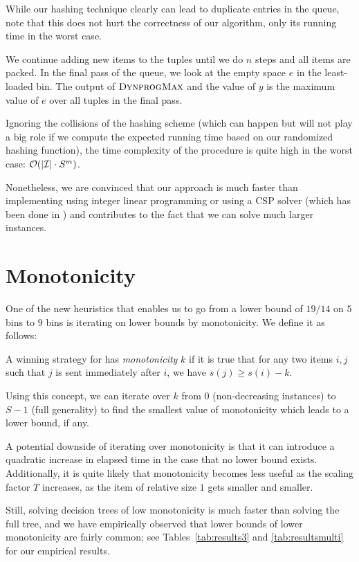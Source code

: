 While our hashing technique clearly can lead to duplicate entries in
the queue, note that this does not hurt the correctness of our
algorithm, only its running time in the worst case.

We continue adding new items to the tuples until we do $n$ steps and
all items are packed. In the final pass of the queue, we look at the
empty space $e$ in the least-loaded bin. The output of $\textsc{DynprogMax}$
and the value of $y$ is the maximum value of $e$ over all tuples in
the final pass.

Ignoring the collisions of the hashing scheme (which can happen but
will not play a big role if we compute the expected running time based
on our randomized hashing function), the time complexity of the
procedure \MaxFeas is quite high in the worst case: ${\mathcal{O}}(|{\mathcal I}|\cdot
S^m)$.

Nonetheless, we are convinced that our approach is much faster than
implementing \MaxFeas using integer linear programming or using a CSP
solver (which has been done in \cite{gabay2013lbv2}) and contributes
to the fact that we can solve much larger instances.

\section{Monotonicity}\label{sec:monotonicity}

One of the new heuristics that enables us to go from a lower bound of
$19/14$ on $5$ bins to $9$ bins is iterating on lower bounds by
monotonicity. We define it as follows:

\begin{dfn}
A winning strategy for \adversary has \emph{monotonicity} $k$ if it is true
that for any two items $i,j$ such that $j$ is sent immediately after
$i$, we have $s(j) \ge s(i) - k$.
\end{dfn}

Using this concept, we can iterate over $k$ from $0$ (non-decreasing
instances) to $S-1$ (full generality) to find the smallest value of
monotonicity which leads to a lower bound, if any.

A potential downside of iterating over monotonicity is that it can
introduce a quadratic increase in elapsed time in the case that no
lower bound exists. Additionally, it is quite likely that monotonicity
becomes less useful as the scaling factor $T$ increases, as the item
of relative size $1$ gets smaller and smaller.

Still, solving decision trees of low monotonicity is much faster than
solving the full tree, and we have empirically observed that lower
bounds of lower monotonicity are fairly common; see
Tables~\ref{tab:results3} and \ref{tab:resultsmulti} for our empirical
results.


